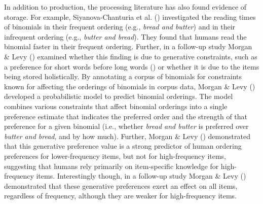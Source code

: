 \documentclass[
  12pt,
  letterpaper,
]{scrreprt}
\begin{document}
In addition to production, the processing literature has also found
evidence of storage. For example, Siyanova-Chanturia et al.
()
investigated the reading times of binomials in their frequent ordering
(e.g., \emph{bread and butter}) and in their infrequent ordering (e.g.,
\emph{butter and bread}). They found that humans read the binomial
faster in their frequent ordering. Further, in a follow-up study Morgan
\& Levy () examined whether this finding
is due to generative constraints, such as a preference for short words
before long words () or whether it is due to the items being stored
holistically. By annotating a corpus of binomials for constraints known
for affecting the orderings of binomials in corpus data, Morgan \& Levy
() developed a
probabilistic model to predict binomial orderings. The model combines
various constraints that affect binomial orderings into a single
preference estimate that indicates the preferred order and the strength
of that preference for a given binomial (i.e., whether \emph{bread and
butter} is preferred over \emph{butter and bread}, and by how much).
Further, Morgan \& Levy
() demonstrated
that this generative preference value is a strong predictor of human
ordering preferences for lower-frequency items, but not for
high-frequency items, suggesting that humans rely primarily on
item-specific knowledge for high-frequency items. Interestingly though,
in a follow-up study Morgan \& Levy ()
demonstrated that these generative preferences exert an effect on all
items, regardless of frequency, although they are weaker for
high-frequency items.
\end{document}
